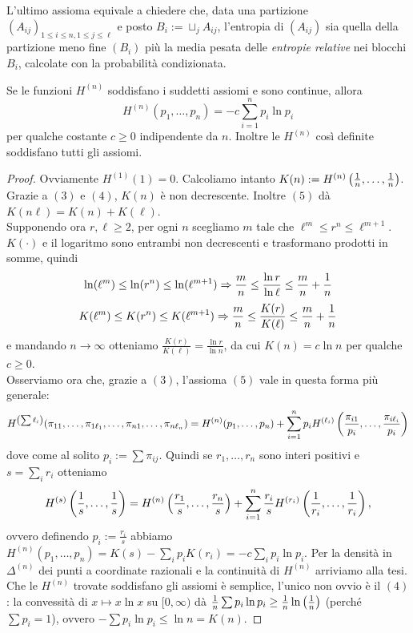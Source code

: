 L'ultimo assioma equivale a chiedere che, data una partizione $(A_{ij})_{1\le i\le n,1\le j\le\ell}$
e posto $B_i:=\sqcup_j A_{ij}$, l'entropia di $(A_{ij})$ sia quella della partizione meno fine $(B_i)$
più la media pesata delle \emph{entropie relative} nei blocchi $B_i$, calcolate con la probabilità condizionata.

\begin{teo}Se le funzioni $H^{(n)}$ soddisfano i suddetti assiomi e sono continue, allora
\[ H^{(n)}(p_1,\dots,p_n)=-c\sum_{i=1}^n p_i\ln p_i \]
per qualche costante $c\ge 0$ indipendente da $n$. Inoltre le $H^{(n)}$ così definite soddisfano tutti gli assiomi.
\end{teo}

\begin{proof}Ovviamente $H^{(1)}(1)=0$. Calcoliamo intanto
$K(n):=H^{(n)}\left(\frac{1}{n},\dots,\frac{1}{n}\right)$. \\
Grazie a $(3)$ e $(4)$, $K(n)$ è non decrescente. Inoltre $(5)$ dà $K(n\ell)=K(n)+K(\ell)$. \\
Supponendo ora $r,\ell\ge 2$, per ogni $n$ scegliamo $m$ tale che $\ell^m\le r^n\le\ell^{m+1}$.
$K(\cdot)$ e il logaritmo sono entrambi non decrescenti e trasformano prodotti in somme, quindi
\[ \ln(\ell^m)\le\ln(r^n)\le\ln(\ell^{m+1})\Rightarrow \frac{m}{n}\le\frac{\ln r}{\ln \ell}\le\frac{m}{n}+\frac{1}{n} \]
\[ K(\ell^m)\le K(r^n)\le K(\ell^{m+1})\Rightarrow \frac{m}{n}\le\frac{K(r)}{K(\ell)}\le\frac{m}{n}+\frac{1}{n} \]
e mandando $n\to\infty$ otteniamo $\frac{K(r)}{K(\ell)}=\frac{\ln r}{\ln n}$, da cui $K(n)=c\ln n$ per qualche $c\ge 0$. \\
Osserviamo ora che, grazie a $(3)$, l'assioma $(5)$ vale in questa forma più generale:
\[ H^{\left(\sum \ell_i\right)}(\pi_{11},\dots,\pi_{1\ell_1},\dots,\pi_{n1},\dots,\pi_{n\ell_n})
=H^{(n)}(p_1,\dots,p_n)+\sum_{i=1}^n p_i H^{(\ell_i)}\left(\frac{\pi_{i1}}{p_i},\dots,\frac{\pi_{i\ell_i}}{p_i}\right) \]
dove come al solito $p_i:=\sum \pi_{ij}$. Quindi se $r_1,\dots,r_n$ sono interi positivi e $s=\sum_i r_i$ otteniamo
\[ H^{(s)}\left(\frac{1}{s},\dots,\frac{1}{s}\right)=H^{(n)}\left(\frac{r_1}{s},\dots,\frac{r_n}{s}\right)
+\sum_{i=1}^n \frac{r_i}{s}H^{(r_i)}\left(\frac{1}{r_i},\dots,\frac{1}{r_i}\right), \]
ovvero definendo $p_i:=\frac{r_i}{s}$ abbiamo $H^{(n)}(p_1,\dots,p_n)=K(s)-\sum_i p_i K(r_i)=-c\sum_i p_i\ln p_i$.
Per la densità in $\Delta^{(n)}$ dei punti a coordinate razionali e la continuità di $H^{(n)}$ arriviamo alla tesi.
Che le $H^{(n)}$ trovate soddisfano gli assiomi è semplice, l'unico non ovvio è il $(4)$: la convessità di $x\mapsto x\ln x$ su $[0,\infty)$ dà
$\frac{1}{n}\sum p_i\ln p_i\ge\frac{1}{n}\ln\left(\frac{1}{n}\right)$ (perché $\sum p_i=1$), ovvero $-\sum p_i\ln p_i\le\ln n=K(n)$.
\end{proof}


